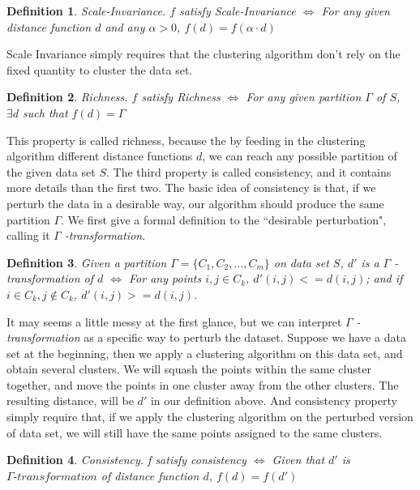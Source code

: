 \documentclass{uonmathreport}
\newtheorem{definition}{Definition}[section]
\begin{document}
\begin{definition}
Scale-Invariance. $f$ satisfy Scale-Invariance $\iff$  For any given distance function $d$ and any $\alpha>0$, $f(d) = f(\alpha\cdot d)$
\end{definition}

Scale Invariance simply requires that the clustering algorithm don't rely on the fixed quantity to cluster the data set.

\begin{definition}
Richness.  $f$ satisfy Richness $\iff$ For any given partition $\Gamma$ of $S$, $\exists d$ such that $f(d) =\Gamma$
\end{definition}

This property is called richness, because the by feeding in the clustering algorithm different distance functions $d$, we can reach any possible partition of the given data set $S$. The third property is called consistency, and it contains more details than the first two. The basic idea of consistency is that, if we perturb the data in a desirable way, our algorithm should produce the same partition $\Gamma$. We first give a formal definition to the ``desirable perturbation", calling it $\Gamma$ \textit{-transformation}.
\begin{definition}
Given a partition $\Gamma=\{C_1,C_2,...,C_m\}$ on data set $S$, 
$d'$ is a $\Gamma$ \textit{-transformation} of $d$ $\iff$ For any points $i,j\in C_k$, $d'(i,j)<=d(i,j)$; and if $i \in C_k, j\notin C_k$, $d'(i,j)>=d(i,j)$.
\end{definition}

It may seems a little messy at the first glance, but we can interpret $\Gamma$ \textit{-transformation} as a specific way to perturb the dataset. Suppose we have a data set at the beginning, then we apply a clustering algorithm on this data set, and obtain several clusters. We will squash the points within the same cluster together, and move the points in one cluster away from the other clusters. The resulting distance, will be $d'$ in our definition above. And consistency property simply require that, if we apply the clustering algorithm on the perturbed version of data set, we will still have the same points assigned to the same clusters.

\begin{definition}
Consistency. f satisfy consistency $\iff$ Given that $d'$ is $\Gamma \textit{-transformation}$ of distance function $d$, $f(d) = f(d')$
\end{definition}
\end{document}
